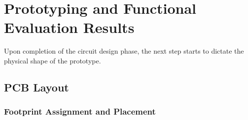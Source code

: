 

\chapter{Prototyping and Functional Evaluation Results}\label{cha:chapter5_PrototypingPerf}

Upon completion of the circuit design phase, the next step starts to dictate the physical shape of the prototype.

\section{PCB Layout}\label{sec:51_PCBlayout} %

\subsection{Footprint Assignment and Placement}\label{sec:511_Placement}

